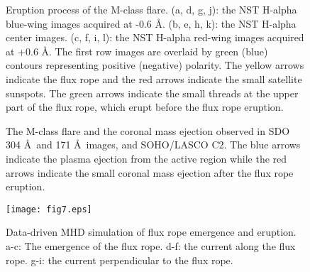 \documentclass[12pt,preprint]{aastex}
\begin{document}
\begin{CJK*}{UTF8}{gbsn}
\begin{figure}
\caption{Eruption process of the M-class flare. (a, d, g, j): the NST H-alpha blue-wing images acquired at -0.6 \AA .  (b, e, h, k): the NST H-alpha center images.  (c, f, i, l): the NST H-alpha red-wing images acquired at +0.6 \AA. The first row images are overlaid by green (blue) contours representing positive (negative) polarity. The yellow arrows indicate the flux rope and the red arrows indicate the small satellite sunspots. The green arrows indicate the small threads at the upper part of the flux rope, which erupt before the flux rope eruption. \label{fig1}}
\end{figure}%

\begin{figure}
\caption{The M-class flare and the coronal mass ejection observed in SDO 304 \AA\ and 171 \AA\ images, and SOHO/LASCO C2. The blue arrows indicate the plasma ejection from the active region while the red arrows indicate the small coronal mass ejection after the flux rope eruption. \label{fig1}}
\end{figure}


\begin{figure}[ht]
{\centering
 \texttt{[image: fig7.eps]}
\caption{Data-driven MHD simulation of flux rope emergence and eruption.  a-c: The emergence of the flux rope. d-f: the current along the flux rope. g-i: the current perpendicular to the flux rope. }
\label{fig6}}
\end{figure}


\end{CJK*}
\end{document}
